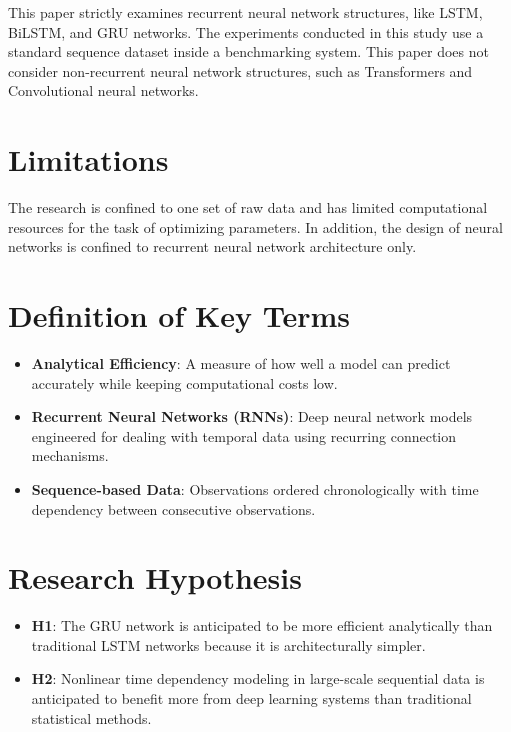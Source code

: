 \documentclass[12pt]{report}
\begin{document}
This paper strictly examines recurrent neural network structures, like LSTM, BiLSTM, and GRU networks. The experiments conducted in this study use a standard sequence dataset inside a benchmarking system. This paper does not consider non-recurrent neural network structures, such as Transformers and Convolutional neural networks.


\section{Limitations}

The research is confined to one set of raw data and has limited computational resources for the task of optimizing parameters. In addition, the design of neural networks is confined to recurrent neural network architecture only.


\section{Definition of Key Terms}

\begin{itemize}
    \item \textbf{Analytical Efficiency}: A measure of how well a model can predict accurately while keeping computational costs low.

    
    \item \textbf{Recurrent Neural Networks (RNNs)}: Deep neural network models engineered for dealing with temporal data using recurring connection mechanisms.

    
    \item \textbf{Sequence-based Data}: Observations ordered chronologically with time dependency between consecutive observations.

\end{itemize}

\section{Research Hypothesis}

\begin{itemize}
    \item \textbf{H1}: The GRU network is anticipated to be more efficient analytically than traditional LSTM networks because it is architecturally simpler.

    
    \item \textbf{H2}: Nonlinear time dependency modeling in large-scale sequential data is anticipated to benefit more from deep learning systems than traditional statistical methods.

\end{itemize}
\end{document}

